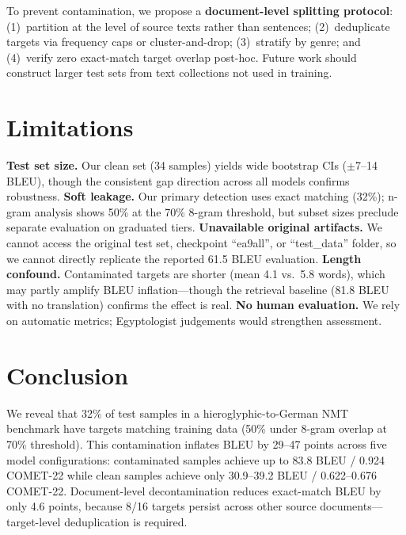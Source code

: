 \documentclass[11pt,a4paper]{article}
\begin{document}
To prevent contamination, we propose a \textbf{document-level splitting protocol}: (1)~partition at the level of source texts rather than sentences; (2)~deduplicate targets via frequency caps or cluster-and-drop; (3)~stratify by genre; and (4)~verify zero exact-match target overlap post-hoc. Future work should construct larger test sets from text collections not used in training.

\section{Limitations}
\label{sec:limitations}

\textbf{Test set size.} Our clean set (34 samples) yields wide bootstrap CIs ($\pm$7--14 BLEU), though the consistent gap direction across all models confirms robustness.
\textbf{Soft leakage.} Our primary detection uses exact matching (32\%); n-gram analysis shows 50\% at the 70\% 8-gram threshold, but subset sizes preclude separate evaluation on graduated tiers.
\textbf{Unavailable original artifacts.} We cannot access the original test set, checkpoint ``ea9all'', or ``test\_data'' folder, so we cannot directly replicate the reported 61.5 BLEU evaluation.
\textbf{Length confound.} Contaminated targets are shorter (mean 4.1 vs.\ 5.8 words), which may partly amplify BLEU inflation---though the retrieval baseline (81.8 BLEU with no translation) confirms the effect is real.
\textbf{No human evaluation.} We rely on automatic metrics; Egyptologist judgements would strengthen assessment.



\section{Conclusion}
\label{sec:conclusion}

We reveal that 32\% of test samples in a hieroglyphic-to-German NMT benchmark have targets matching training data (50\% under 8-gram overlap at 70\% threshold). This contamination inflates BLEU by 29--47 points across five model configurations: contaminated samples achieve up to 83.8 BLEU / 0.924 COMET-22 while clean samples achieve only 30.9--39.2 BLEU / 0.622--0.676 COMET-22. Document-level decontamination reduces exact-match BLEU by only 4.6 points, because 8/16 targets persist across other source documents---target-level deduplication is required.
\end{document}
